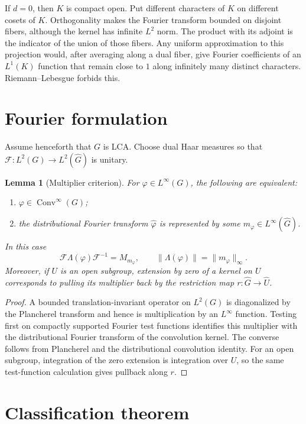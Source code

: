 \documentclass[11pt]{article}
\newtheorem{lemma}{Lemma}
\newcommand{\Conv}{\operatorname{Conv}^{\infty}}
\newcommand{\F}{\mathcal F}
\begin{document}
If $d=0$, then $K$ is compact open.  Put different characters of $K$ on
different cosets of $K$.  Orthogonality makes the Fourier transform bounded on
disjoint fibers, although the kernel has infinite $L^2$ norm.  The product
with its adjoint is the indicator of the union of those fibers.  Any uniform
approximation to this projection would, after averaging along a dual fiber,
give Fourier coefficients of an $L^1(K)$ function that remain close to $1$
along infinitely many distinct characters.  Riemann--Lebesgue forbids this.

\section{Fourier formulation}

Assume henceforth that $G$ is LCA.  Choose dual Haar measures so that
$\F:L^2(G)\to L^2(\widehat G)$ is unitary.

\begin{lemma}[Multiplier criterion]\label{lem:multiplier}
For $\varphi\in L^\infty(G)$, the following are equivalent:
\begin{enumerate}
\item $\varphi\in\Conv(G)$;
\item the distributional Fourier transform $\widehat\varphi$ is represented
by some $m_\varphi\in L^\infty(\widehat G)$.
\end{enumerate}
In this case
\[
 \F\Lambda(\varphi)\F^{-1}=M_{m_\varphi},\qquad
 \|\Lambda(\varphi)\|=\|m_\varphi\|_\infty.
\]
Moreover, if $U$ is an open subgroup, extension by zero of a kernel on $U$
corresponds to pulling its multiplier back by the restriction map
$r:\widehat G\to\widehat U$.
\end{lemma}

\begin{proof}
A bounded translation-invariant operator on $L^2(G)$ is diagonalized by the
Plancherel transform and hence is multiplication by an $L^\infty$ function.
Testing first on compactly supported Fourier test functions identifies this
multiplier with the distributional Fourier transform of the convolution
kernel.  The converse follows from Plancherel and the distributional
convolution identity.  For an open subgroup, integration of the zero extension
is integration over $U$, so the same test-function calculation gives pullback
along $r$.
\end{proof}

\section{Classification theorem}
\end{document}
